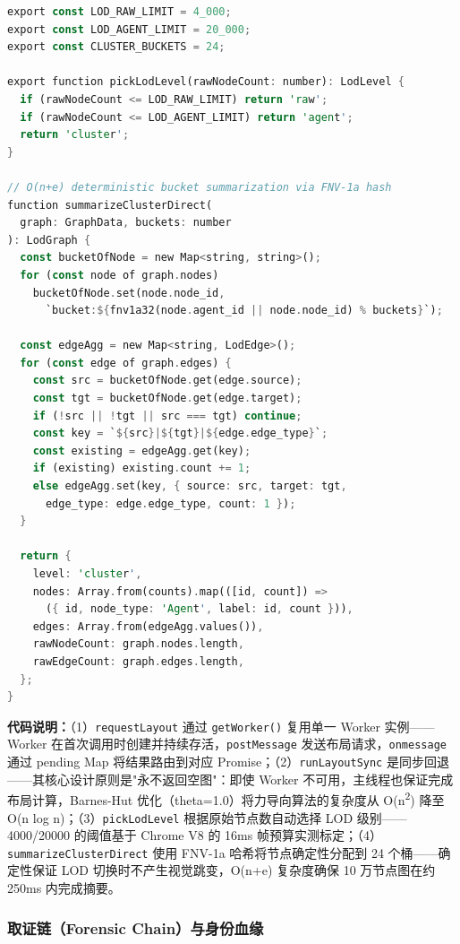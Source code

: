 \documentclass[a4paper]{ctexart}
\makeatletter
\renewcommand{\_}{%
  \ifmmode
    \nfss@text{\textunderscore}%
  \else
    \textunderscore\discretionary{}{}{}%
  \fi}
\makeatother
\begin{document}
\begin{lstlisting}[language={Rust}, caption={// frontend/lib/graph-lod.ts — LOD 三级降载与确定性哈希分桶}]
export const LOD_RAW_LIMIT = 4_000;
export const LOD_AGENT_LIMIT = 20_000;
export const CLUSTER_BUCKETS = 24;

export function pickLodLevel(rawNodeCount: number): LodLevel {
  if (rawNodeCount <= LOD_RAW_LIMIT) return 'raw';
  if (rawNodeCount <= LOD_AGENT_LIMIT) return 'agent';
  return 'cluster';
}

// O(n+e) deterministic bucket summarization via FNV-1a hash
function summarizeClusterDirect(
  graph: GraphData, buckets: number
): LodGraph {
  const bucketOfNode = new Map<string, string>();
  for (const node of graph.nodes)
    bucketOfNode.set(node.node_id,
      `bucket:${fnv1a32(node.agent_id || node.node_id) % buckets}`);

  const edgeAgg = new Map<string, LodEdge>();
  for (const edge of graph.edges) {
    const src = bucketOfNode.get(edge.source);
    const tgt = bucketOfNode.get(edge.target);
    if (!src || !tgt || src === tgt) continue;
    const key = `${src}|${tgt}|${edge.edge_type}`;
    const existing = edgeAgg.get(key);
    if (existing) existing.count += 1;
    else edgeAgg.set(key, { source: src, target: tgt,
      edge_type: edge.edge_type, count: 1 });
  }

  return {
    level: 'cluster',
    nodes: Array.from(counts).map(([id, count]) =>
      ({ id, node_type: 'Agent', label: id, count })),
    edges: Array.from(edgeAgg.values()),
    rawNodeCount: graph.nodes.length,
    rawEdgeCount: graph.edges.length,
  };
}
\end{lstlisting}

\textbf{代码说明：}（1）\texttt{requestLayout} 通过 \texttt{getWorker()} 复用单一 Worker 实例——Worker 在首次调用时创建并持续存活，\texttt{postMessage} 发送布局请求，\texttt{onmessage} 通过 pending Map 将结果路由到对应 Promise；（2）\texttt{runLayoutSync} 是同步回退——其核心设计原则是"永不返回空图"：即使 Worker 不可用，主线程也保证完成布局计算，Barnes-Hut 优化（theta=1.0）将力导向算法的复杂度从 O(n\textsuperscript{2}) 降至 O(n log n)；（3）\texttt{pickLodLevel} 根据原始节点数自动选择 LOD 级别——4000/20000 的阈值基于 Chrome V8 的 16ms 帧预算实测标定；（4）\texttt{summarizeClusterDirect} 使用 FNV-1a 哈希将节点确定性分配到 24 个桶——确定性保证 LOD 切换时不产生视觉跳变，O(n+e) 复杂度确保 10 万节点图在约 250ms 内完成摘要。

\subsubsection{取证链（Forensic Chain）与身份血缘}
\end{document}
